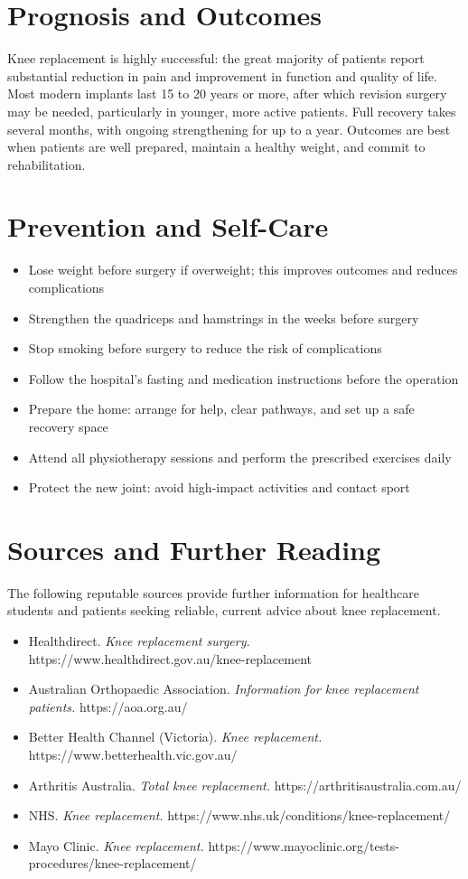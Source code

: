 \section*{Prognosis and Outcomes}
Knee replacement is highly successful: the great majority of patients report substantial reduction in pain and improvement in function and quality of life. Most modern implants last 15 to 20 years or more, after which revision surgery may be needed, particularly in younger, more active patients. Full recovery takes several months, with ongoing strengthening for up to a year. Outcomes are best when patients are well prepared, maintain a healthy weight, and commit to rehabilitation.

\section*{Prevention and Self-Care}
\begin{itemize}
    \item Lose weight before surgery if overweight; this improves outcomes and reduces complications
    \item Strengthen the quadriceps and hamstrings in the weeks before surgery
    \item Stop smoking before surgery to reduce the risk of complications
    \item Follow the hospital's fasting and medication instructions before the operation
    \item Prepare the home: arrange for help, clear pathways, and set up a safe recovery space
    \item Attend all physiotherapy sessions and perform the prescribed exercises daily
    \item Protect the new joint: avoid high-impact activities and contact sport
\end{itemize}

\section*{Sources and Further Reading}
The following reputable sources provide further information for healthcare students and patients seeking reliable, current advice about knee replacement.
\begin{itemize}
    \item Healthdirect. \textit{Knee replacement surgery.} https://www.healthdirect.gov.au/knee-replacement
    \item Australian Orthopaedic Association. \textit{Information for knee replacement patients.} https://aoa.org.au/
    \item Better Health Channel (Victoria). \textit{Knee replacement.} https://www.betterhealth.vic.gov.au/
    \item Arthritis Australia. \textit{Total knee replacement.} https://arthritisaustralia.com.au/
    \item NHS. \textit{Knee replacement.} https://www.nhs.uk/conditions/knee-replacement/
    \item Mayo Clinic. \textit{Knee replacement.} https://www.mayoclinic.org/tests-procedures/knee-replacement/
\end{itemize}
